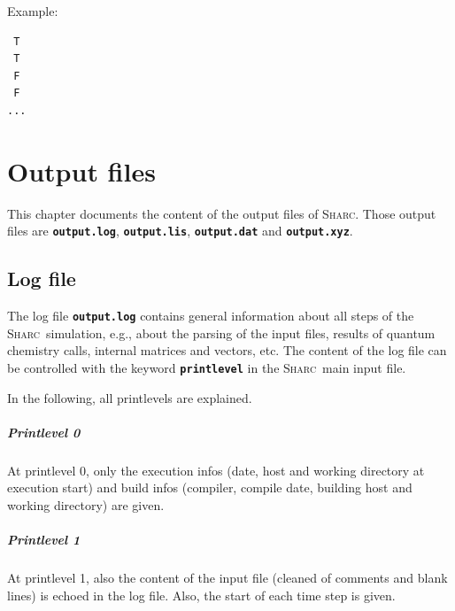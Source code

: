 \documentclass[a4paper,10pt,DIV=15,openany,twoside=false]{scrbook}
\newcommand{\sharc}{\textsc{Sharc}}
\newcommand{\ttt}[1]{\textbf{\texttt{#1}}}
\newenvironment{example}{
  \setlength{\OuterFrameSep}{3pt}
  \vspace{0mm}
  \definecolor{shadecolor}{HTML}{E4F4FF}
  \begin{shaded}
}{
  \end{shaded}
}
\begin{document}
Example:
\begin{example}
\begin{verbatim}
 T
 T
 F
 F
...
\end{verbatim}
\end{example}



\chapter{Output files}\label{chap:output}

This chapter documents the content of the output files of \sharc. Those output files are \ttt{output.log}, \ttt{output.lis}, \ttt{output.dat} and \ttt{output.xyz}.

\section{Log file}\label{sec:logfile}

The log file \ttt{output.log} contains general information about all steps of the \sharc\ simulation, e.g., about the parsing of the input files, results of quantum chemistry calls, internal matrices and vectors, etc. The content of the log file can be controlled with the keyword \ttt{printlevel} in the \sharc\ main input file.

In the following, all printlevels are explained.

\paragraph{Printlevel 0}

At printlevel 0, only the execution infos (date, host and working directory at execution start) and build infos (compiler, compile date, building host and working directory) are given.

\paragraph{Printlevel 1}

At printlevel 1, also the content of the input file (cleaned of comments and blank lines) is echoed in the log file. Also, the start of each time step is given.
\end{document}
